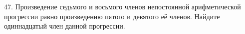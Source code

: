47. Произведение седьмого и восьмого членов непостоянной арифметической прогрессии равно произведению пятого и девятого её членов. Найдите одиннадцатый член данной прогрессии.\\
